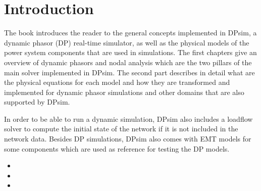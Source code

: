 \chapter{Introduction}
The book introduces the reader to the general concepts implemented in DPsim, a dynamic phasor (DP) real-time simulator, as well as the physical models of the power system components that are used in simulations.
The first chapters give an overview of dynamic phasors and nodal analysis which are the two pillars of the main solver implemented in DPsim.
The second part describes in detail what are the physical equations for each model and how they are transformed and implemented for dynamic phasor simulations and other domains that are also supported by DPsim.

In order to be able to run a dynamic simulation, DPsim also includes a loadflow solver to compute the initial state of the network if it is not included in the network data.
Besides DP simulations, DPsim also comes with EMT models for some components which are used as reference for testing the DP models.

\begin{itemize}
    \item {}
    \item {}
    \item {}
\end{itemize}